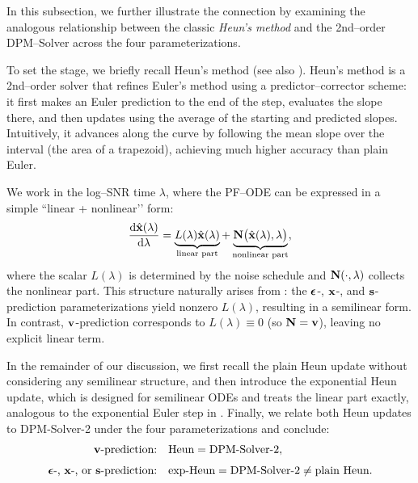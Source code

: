 In this subsection, we further illustrate the connection by examining the analogous relationship between the classic \emph{Heun's method} and the 2nd–order DPM–Solver across the four parameterizations.


To set the stage, we briefly recall Heun’s method (see also ). 
Heun’s method is a 2nd–order solver that refines Euler’s method using a predictor–corrector scheme: 
it first makes an Euler prediction to the end of the step, evaluates the slope there, and then updates using 
the average of the starting and predicted slopes. 
Intuitively, it advances along the curve by following the mean slope over the interval 
(the area of a trapezoid), achieving much higher accuracy than plain Euler.

We work in the log--SNR time $\lambda$, where the PF--ODE can be expressed in a simple ``linear + nonlinear’’ form:
\[
\frac{\mathop{}\!\mathrm{d} \hat{{\mathbf{x}}}(\lambda)}{\mathop{}\!\mathrm{d} \lambda}
= \underbrace{L(\lambda)\hat{{\mathbf{x}}}(\lambda)}_{\text{linear part}} + \underbrace{{\mathbf{N}}\big(\hat{{\mathbf{x}}}(\lambda),\lambda\big)}_{\text{nonlinear part}},
\]
where the scalar $L(\lambda)$ is determined by the noise schedule and ${\mathbf{N}}(\cdot,\lambda)$ collects the nonlinear part. 
This structure naturally arises from : the ${\bm{\epsilon}}$-, ${\mathbf{x}}$-, and ${\mathbf{s}}$-prediction parameterizations yield nonzero $L(\lambda)$, resulting in a semilinear form. 
In contrast, ${\mathbf{v}}$-prediction corresponds to $L(\lambda)\equiv 0$ (so ${\mathbf{N}}={\mathbf{v}}$), leaving no explicit linear term.


In the remainder of our discussion, we first recall the plain Heun update without considering any semilinear structure, 
and then introduce the exponential Heun update, which is designed for semilinear ODEs and treats the linear part exactly, analogous to the exponential Euler step in .
Finally, we relate both Heun updates to DPM-Solver-2 under the four parameterizations and conclude:
\begin{align*}
\text{${\mathbf{v}}$-prediction:} 
&\quad \text{Heun} = \text{DPM-Solver-2}, \\[4pt]
\text{${\bm{\epsilon}}$-, ${\mathbf{x}}$-, or ${\mathbf{s}}$-prediction:} 
&\quad \text{exp-Heun} = \text{DPM-Solver-2} \neq \text{plain Heun}.
\end{align*}

